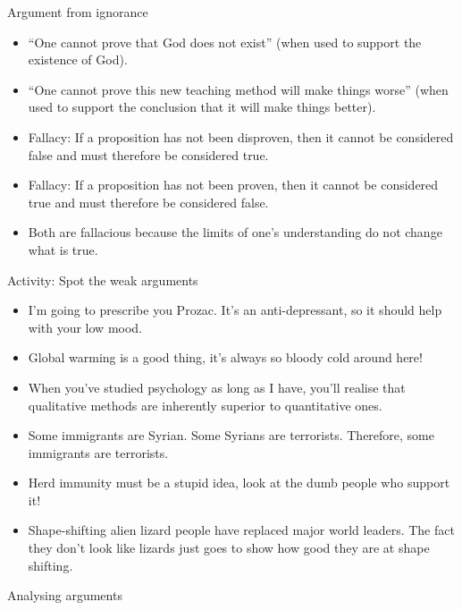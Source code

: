 \documentclass{beamer}
\begin{document}
\begin{frame}{Argument from ignorance}
\begin{itemize}
\item ``One cannot prove that God does not exist'' (when used to support the existence of God).
\item ``One cannot prove this new teaching method will make things worse'' (when used to support the conclusion that it will make things better). 
\item Fallacy: If a proposition has not been disproven, then it cannot be considered false and must therefore be considered true.
\item Fallacy: If a proposition has not been proven, then it cannot be considered true and must therefore be considered false.
\item Both are fallacious because the limits of one's understanding do not change what is true.
\end{itemize}
\end{frame}

\begin{frame}{Activity: Spot the weak arguments}
\begin{itemize}
\item I'm going to prescribe you Prozac. It's an anti-depressant, so it should help with your low mood. 
  
\item Global warming is a good thing, it's always so bloody cold around here!

\item When you've studied psychology as long as I have, you'll realise that qualitative methods are inherently superior to quantitative ones.
  
\item Some immigrants are Syrian. Some Syrians are terrorists. Therefore, some immigrants are terrorists.

\item Herd immunity must be a stupid idea, look at the dumb people who support it!

\item Shape-shifting alien lizard people have replaced major world leaders. The fact they don't look like lizards just goes to show how good they are at shape shifting. 
\end{itemize}  
\end{frame}

\begin{frame}{Analysing arguments}

\end{frame}
\end{document}
